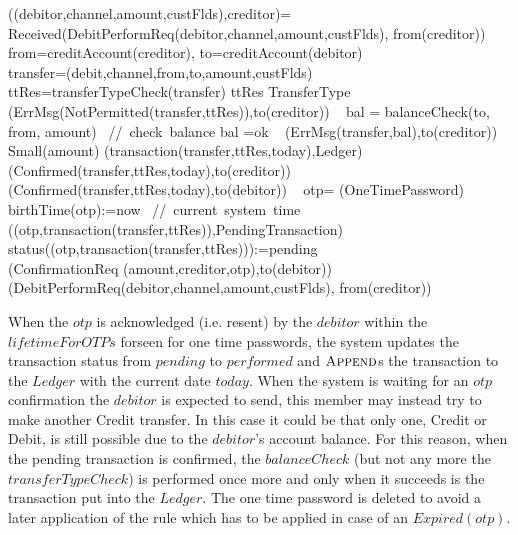 \begin{asm}
((debitor,channel,amount,custFlds),creditor)=\+
\IF  Received(DebitPerformReq(debitor,channel,amount,custFlds),
                 from(creditor)) \THEN \+     
  \LET from=creditAccount(creditor), to=creditAccount(debitor)\\
  \LET transfer=(debit,channel,from,to,amount,custFlds) \\
  \LET ttRes=transferTypeCheck(transfer) \+
        \IF ttRes \not \in TransferType \THEN \+    (ErrMsg(NotPermitted(transfer,ttRes)),to(creditor))\-
       \ELSE~  \LET bal = balanceCheck(to, from, amount)  
                \mbox{ // check balance}\+
       \IF bal \not =ok \THEN ~ (ErrMsg(transfer,bal),to(creditor))   \ELSE \+
         \IF Small(amount) \+
              \THEN \+ 
                   (transaction(transfer,ttRes,today),Ledger) \\
                   (Confirmed(transfer,ttRes,today),to(creditor))\\
                   (Confirmed(transfer,ttRes,today),to(debitor))\-
              \ELSE ~ \LET otp= \NEW(OneTimePassword)\+
                  birthTime(otp):=now \mbox{ // current system time}\\
                  ((otp,transaction(transfer,ttRes)),PendingTransaction)\\ 
                   status((otp,transaction(transfer,ttRes))):=pending \\
                   (ConfirmationReq
                    (amount,creditor,otp),to(debitor))\dec\dec\dec\dec\-
   (DebitPerformReq(debitor,channel,amount,custFlds),
                 from(creditor))
\end{asm}
             
When the $otp$ is acknowledged (i.e. resent) by the $debitor$ 
within the $lifetimeForOTPs$ forseen for one time passwords, the system updates the transaction status from $pending$ to $performed$ and 
$\hbox{\sc Append}$s the transaction to the $Ledger$ with the current date $today$. When the system is waiting for an $otp$ confirmation the $debitor$ is expected to send, this member may instead try to make another Credit transfer. In this case it could be that only one, Credit or Debit, is still possible due to the $debitor$'s account balance. For this reason, when the pending transaction is confirmed, the $balanceCheck$  (but not any more the $transferTypeCheck$) is performed once more and only when it succeeds is the transaction put into the $Ledger$. The one time password is deleted to avoid a later application of the rule which has to be applied in case of an $Expired(otp)$. 
              
